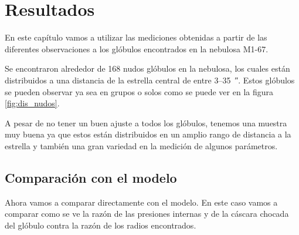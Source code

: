 \documentclass{book}
\begin{document}
\chapter{Resultados}

En este capítulo vamos a utilizar las mediciones obtenidas a partir de las diferentes observaciones a los glóbulos encontrados en la nebulosa M1-67.

Se encontraron alrededor de 168 nudos glóbulos en la nebulosa, los cuales están distribuidos a una distancia de la estrella central de entre 3--\SI{35}{\arcsecond}.  Estos glóbulos se pueden observar ya sea en grupos o solos como se puede ver en la figura \ref{fig:dis_nudos}. 

A pesar de no tener un buen ajuste a todos los glóbulos, tenemos una muestra muy buena ya que estos están distribuidos en un amplio rango de distancia a la estrella y también una gran variedad en la medición de algunos parámetros. 




\section{Comparación con el modelo}\label{Sec : comparacion-modelo}

Ahora vamos a comparar directamente con el modelo. En este caso vamos a comparar como se ve la razón de las presiones internas y de la cáscara chocada del glóbulo contra la razón de los radios encontrados. 
\end{document}
